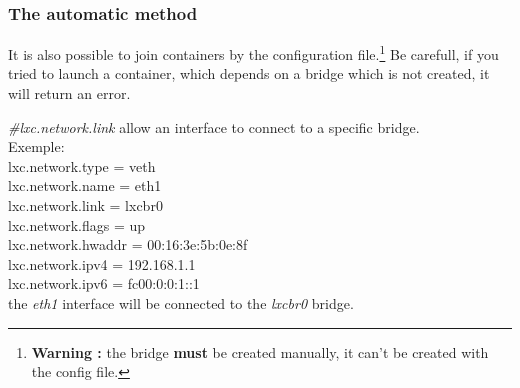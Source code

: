 \documentclass{article}
\begin{document}
\subsubsection{The automatic method}

It is also possible to join containers by the configuration file.\footnote{\textbf{Warning : }the bridge \textbf{must} be created manually, it can't be created with the config file.}
Be carefull, if you tried to launch a container, which depends on a bridge which is not created, it will return an error.

\noindent
\emph{\#lxc.network.link} allow an interface to connect to a specific bridge.\\

Exemple:\\
\noindent
lxc.network.type = veth\\
lxc.network.name = eth1\\
lxc.network.link = lxcbr0\\
lxc.network.flags = up\\
lxc.network.hwaddr = 00:16:3e:5b:0e:8f\\
lxc.network.ipv4 = 192.168.1.1\\
lxc.network.ipv6 = fc00:0:0:1::1\\

\noindent
the \emph{eth1} interface will be connected to the \emph{lxcbr0} bridge.
\end{document}
